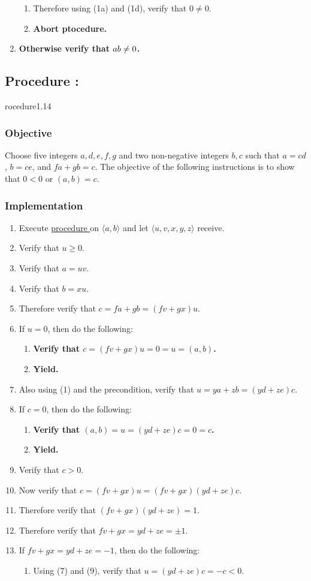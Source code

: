 \documentclass{article}
\let\mod\relax\DeclareMathOperator{\mod}{mod}
\newcounter{procedure}[part]
\newcommand{\procedure}[1]{\subsection*{Procedure \thepart:\theprocedure}\label{sec:procedure #1}\global\expandafter\edef\csname procedure#1\endcsname{\thepart:\theprocedure}\addtocounter{procedure}{1}}
\newcommand{\objective}{\subsubsection*{Objective}}
\newcommand{\implementation}{\subsubsection*{Implementation}}
\newcommand{\procedurehr}[1]{\hyperref[sec:procedure #1]{procedure \expandafter\csname procedure#1\endcsname}}
\begin{document}
\begin{multicols}{2}
\begin{enumerate}
\begin{enumerate}
						\item Therefore using (1a) and (1d), verify that $0\ne 0$.
						\item \textbf{Abort ptocedure.}
					\end{enumerate}
					\item \textbf{Otherwise verify that $a\mod b\ne 0$.}
				\end{enumerate}
		\procedure{1.14}
			\objective
				Choose five integers $a,d,e,f,g$ and two non-negative integers $b,c$ such that $a=cd$, $b=ce$, and $fa+gb=c$. The objective of the following instructions is to show that $0<0$ or $(a,b)=c$.
			\implementation
				\begin{enumerate}
					\item Execute \procedurehr{1.09} on $\langle a,b\rangle$ and let $\langle u,v,x,y,z\rangle$ receive.
					\item Verify that $u\ge 0$.
					\item Verify that $a=uv$.
					\item Verify that $b=xu$.
					\item Therefore verify that $c=fa+gb=(fv+gx)u$.
					\item If $u=0$, then do the following:
					\begin{enumerate}
						\item \textbf{Verify that $c=(fv+gx)u=0=u=(a,b)$.}
						\item \textbf{Yield.}
					\end{enumerate}
					\item Also using (1) and the precondition, verify that $u=ya+zb=(yd+ze)c$.
					\item If $c=0$, then do the following:
					\begin{enumerate}
						\item \textbf{Verify that $(a,b)=u=(yd+ze)c=0=c$.}
						\item \textbf{Yield.}
					\end{enumerate}
					\item Verify that $c>0$.
					\item Now verify that $c=(fv+gx)u=(fv+gx)(yd+ze)c$.
					\item Therefore verify that $(fv+gx)(yd+ze)=1$.
					\item Therefore verify that $fv+gx=yd+ze=\pm 1$.
					\item If $fv+gx=yd+ze=-1$, then do the following:
					\begin{enumerate}
						\item Using (7) and (9), verify that $u=(yd+ze)c=-c<0$.

\end{enumerate}
\end{enumerate}
\end{multicols}
\end{document}
